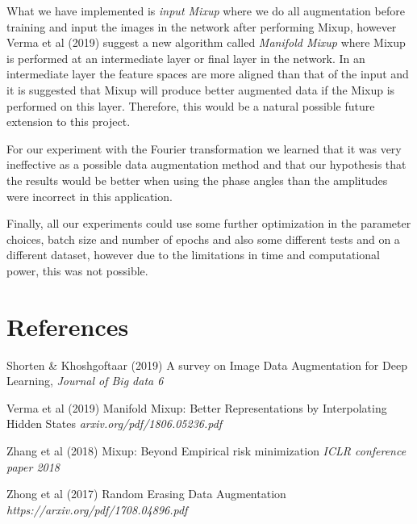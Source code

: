 \documentclass{article}
\begin{document}
What we have implemented is \textit{input Mixup} where we do all augmentation before training and input the images in the network after performing Mixup, however Verma et al (2019) 
suggest a new algorithm called \textit{Manifold Mixup} where Mixup is performed at an intermediate layer or final layer in the network. In an intermediate layer 
the feature spaces are more aligned than that of the input and it is suggested that Mixup will produce better augmented data if the Mixup is performed on this layer. Therefore, this would be 
a natural possible future extension to this project. 

For our experiment with the Fourier transformation we learned that it was very ineffective as a possible data augmentation method and that our hypothesis 
that the results would be better when using the phase angles than the amplitudes were incorrect in this application. 

Finally, all our experiments could use some further optimization in the parameter choices, batch size and number of epochs and also some different tests and on a different dataset, however due to the limitations 
in time and computational power, this was not possible. 

\section*{References}

Shorten \& Khoshgoftaar (2019) A survey on Image Data Augmentation for Deep Learning, \textit{Journal of Big data 6}

Verma et al (2019) Manifold Mixup: Better Representations by Interpolating Hidden States \textit{arxiv.org/pdf/1806.05236.pdf}

Zhang et al (2018) Mixup: Beyond Empirical risk minimization \textit{ICLR conference paper 2018}

Zhong et al (2017) Random Erasing Data Augmentation \textit{https://arxiv.org/pdf/1708.04896.pdf}
\end{document}
